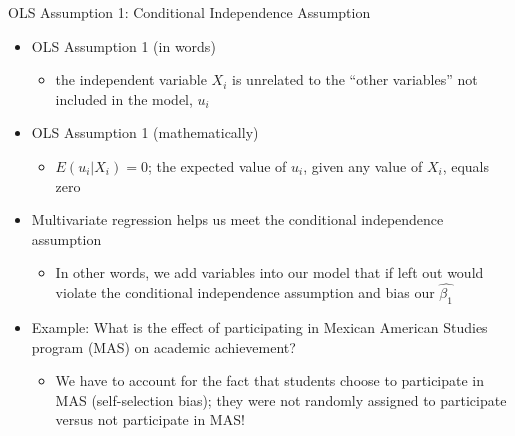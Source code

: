 \documentclass[
  8pt,
  ignorenonframetext,
  dvipsnames]{beamer}
\providecommand{\tightlist}{%
  \setlength{\itemsep}{0pt}\setlength{\parskip}{0pt}}
\let\olditem\item
\renewcommand{\item}{%
  \olditem\vspace{4pt}
}
\begin{document}
\begin{frame}{OLS Assumption 1: Conditional Independence Assumption}
\protect\hypertarget{ols-assumption-1-conditional-independence-assumption}{}

\begin{itemize}
\tightlist
\item
  OLS Assumption 1 (in words)

  \begin{itemize}
  \tightlist
  \item
    the independent variable \(X_i\) is unrelated to the ``other
    variables'' not included in the model, \(u_i\)
  \end{itemize}
\item
  OLS Assumption 1 (mathematically)

  \begin{itemize}
  \tightlist
  \item
    \(E(u_i|X_i)=0\); the expected value of \(u_i\), given any value of
    \(X_i\), equals zero
  \end{itemize}
\item
  Multivariate regression helps us meet the conditional independence
  assumption

  \begin{itemize}
  \tightlist
  \item
    In other words, we add variables into our model that if left out
    would violate the conditional independence assumption and bias our
    \(\hat{\beta_1}\)
  \end{itemize}
\item
  Example: What is the effect of participating in Mexican American
  Studies program (MAS) on academic achievement?

  \begin{itemize}
  \tightlist
  \item
    We have to account for the fact that students choose to participate
    in MAS (self-selection bias); they were not randomly assigned to
    participate versus not participate in MAS!
  \end{itemize}
\end{itemize}

\end{frame}
\end{document}
